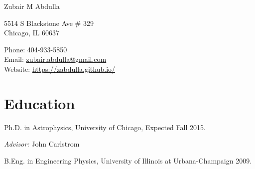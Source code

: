 \documentclass[11pt,letterpaper]{article}
\def\name{Zubair M Abdulla}
\renewenvironment{itemize}{
  \begin{list}{}{
    \setlength{\leftmargin}{1.5em}
    \setlength{\itemsep}{0.10em}
    \setlength{\parskip}{0pt}
    \setlength{\parsep}{0.10em}
  }
}{
  \end{list}
}
\begin{document}
{\huge \name}


\bigskip

\begin{minipage}[t]{0.495\textwidth}
  5514 S Blackstone Ave \# 329 \\
  Chicago, IL 60637
\end{minipage}
\begin{minipage}[t]{0.495\textwidth}
  Phone: 404-933-5850 \\
  Email: \href{mailto:zubair.abdulla@gmail.com}{zubair.abdulla@gmail.com} \\
  Website: \href{https://zabdulla.github.io/}{https://zabdulla.github.io/}
\end{minipage}




\section*{\bf Education}

\begin{itemize}
  \item Ph.D. in Astrophysics, University of Chicago, {Expected Fall 2015}.
    \begin{itemize}
    \item \emph{Advisor:} John Carlstrom %
    \end{itemize}
  \item B.Eng. in Engineering Physics,
    University of Illinois at Urbana-Champaign 2009.

\end{itemize}
\end{document}
